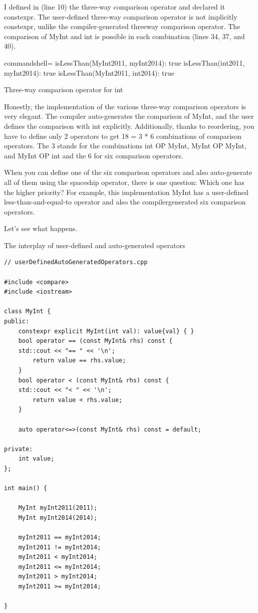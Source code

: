 I defined in (line 10) the three-way comparison operator and declared it constexpr. The user-defined three-way comparison operator is not implicitly constexpr, unlike the compiler-generated threeway comparison operator. The comparison of MyInt and int is possible in each combination (lines 34, 37, and 40).

\begin{tcblisting}{commandshell={}}
isLessThan(MyInt2011, myInt2014): true
isLessThan(int2011, myInt2014): true
isLessThan(MyInt2011, int2014): true
\end{tcblisting}

\begin{center}
Three-way comparison operator for int
\end{center}

Honestly, the implementation of the various three-way comparison operators is very elegant. The compiler auto-generates the comparison of MyInt, and the user defines the comparison with int explicitly. Additionally, thanks to reordering, you have to define only 2 operators to get 18 = 3 * 6 combinations of comparison operators. The 3 stands for the combinations int OP MyInt, MyInt OP MyInt, and MyInt OP int and the 6 for six comparison operators.


When you can define one of the six comparison operators and also auto-generate all of them using the spaceship operator, there is one question: Which one has the higher priority? For example, this implementation MyInt has a user-defined less-than-and-equal-to operator and also the compilergenerated six comparison operators.

Let’s see what happens.

\noindent
The interplay of user-defined and auto-generated operators
\begin{lstlisting}[style=styleCXX]
// userDefinedAutoGeneratedOperators.cpp

#include <compare>
#include <iostream>

class MyInt {
public:
	constexpr explicit MyInt(int val): value{val} { }
	bool operator == (const MyInt& rhs) const {
	std::cout << "== " << '\n';
		return value == rhs.value;
	}
	bool operator < (const MyInt& rhs) const {
	std::cout << "< " << '\n';
		return value < rhs.value;
	}
	
	auto operator<=>(const MyInt& rhs) const = default;

private:
	int value;
};

int main() {

	MyInt myInt2011(2011);
	MyInt myInt2014(2014);
	
	myInt2011 == myInt2014;
	myInt2011 != myInt2014;
	myInt2011 < myInt2014;
	myInt2011 <= myInt2014;
	myInt2011 > myInt2014;
	myInt2011 >= myInt2014;

}
\end{lstlisting}

